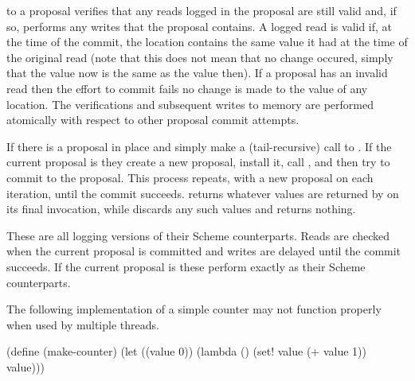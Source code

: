  to a proposal verifies that any reads logged in
 the proposal are still valid and, if so, performs any writes that
 the proposal contains.
A logged read is valid if, at the time of the commit, the location contains
 the same value it had at the time of the original read (note that this does
 not mean that no change occured, simply that the value now is the same as
 the value then).
If a proposal has an invalid read then the effort to commit fails no change
 is made to the value of any location.
The verifications and subsequent writes to memory are performed atomically
 with respect to other proposal commit attempts.

\begin{protos}
\end{protos}
\noindent
If there is a proposal in place 
  and 
 simply make a (tail-recursive) call to .
If the current proposal is  they create a new proposal,
 install it, call , and then try to commit to the proposal.
This process repeats, with a new proposal on each iteration, until
 the commit succeeds.
 returns whatever values are returned by 
 on its final invocation, while  discards any such
 values and returns nothing.

\begin{protos}
\end{protos}
\noindent
These are all logging versions of their Scheme counterparts.
Reads are checked when the current proposal is committed and writes are
 delayed until the commit succeeds.
If the current proposal is  these perform exactly as their Scheme
 counterparts.

The following implementation of a simple counter may not function properly
 when used by multiple threads.
\begin{example}
(define (make-counter)
  (let ((value 0))
    (lambda ()
      (set! value (+ value 1))
      value)))
\end{example}

